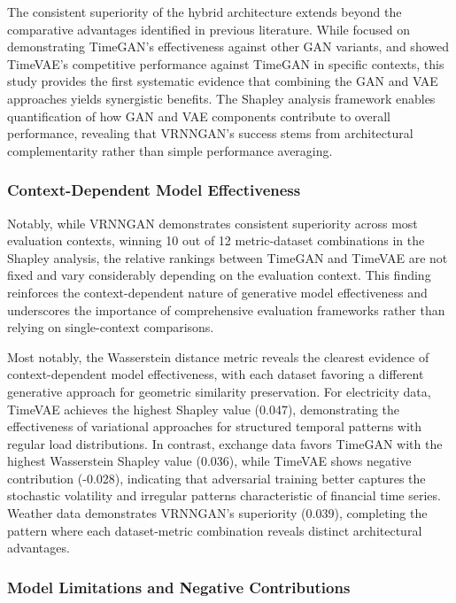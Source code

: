 \documentclass[11pt]{article}
\begin{document}
The consistent superiority of the hybrid architecture extends beyond the comparative advantages identified in previous literature. While \textcite{yoon_time-series_2019} focused on demonstrating TimeGAN's effectiveness against other GAN variants, and \textcite{desai_timevae_2021} showed TimeVAE's competitive performance against TimeGAN in specific contexts, this study provides the first systematic evidence that combining the GAN and VAE approaches yields synergistic benefits. The Shapley analysis framework enables quantification of how GAN and VAE components contribute to overall performance, revealing that VRNNGAN's success stems from architectural complementarity rather than simple performance averaging.

\subsubsection*{Context-Dependent Model Effectiveness}

Notably, while VRNNGAN demonstrates consistent superiority across most evaluation contexts, winning 10 out of 12 metric-dataset combinations in the Shapley analysis, the relative rankings between TimeGAN and TimeVAE are not fixed and vary considerably depending on the evaluation context. This finding reinforces the context-dependent nature of generative model effectiveness and underscores the importance of comprehensive evaluation frameworks rather than relying on single-context comparisons.

Most notably, the Wasserstein distance metric reveals the clearest evidence of context-dependent model effectiveness, with each dataset favoring a different generative approach for geometric similarity preservation. For electricity data, TimeVAE achieves the highest Shapley value (0.047), demonstrating the effectiveness of variational approaches for structured temporal patterns with regular load distributions. In contrast, exchange data favors TimeGAN with the highest Wasserstein Shapley value (0.036), while TimeVAE shows negative contribution (-0.028), indicating that adversarial training better captures the stochastic volatility and irregular patterns characteristic of financial time series. Weather data demonstrates VRNNGAN's superiority (0.039), completing the pattern where each dataset-metric combination reveals distinct architectural advantages.

\subsubsection*{Model Limitations and Negative Contributions}
\end{document}
